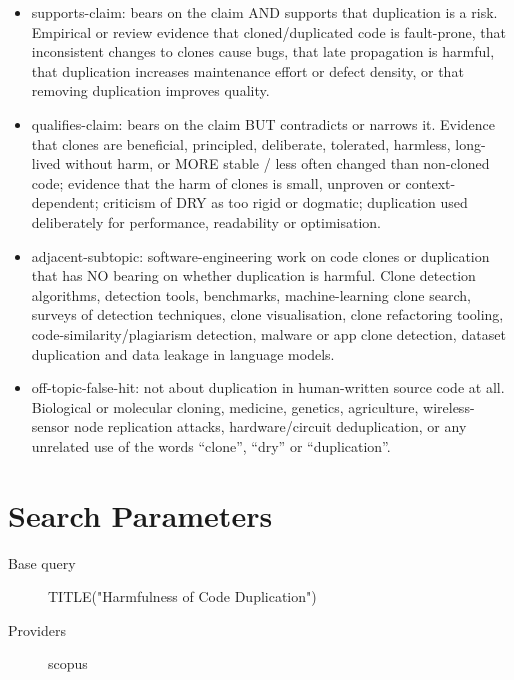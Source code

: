 \documentclass{article}
\begin{document}
\begin{itemize}
\item
  supports-claim: bears on the claim AND supports that duplication is a
  risk. Empirical or review evidence that cloned/duplicated code is
  fault-prone, that inconsistent changes to clones cause bugs, that late
  propagation is harmful, that duplication increases maintenance effort
  or defect density, or that removing duplication improves quality.
\item
  qualifies-claim: bears on the claim BUT contradicts or narrows it.
  Evidence that clones are beneficial, principled, deliberate,
  tolerated, harmless, long-lived without harm, or MORE stable / less
  often changed than non-cloned code; evidence that the harm of clones
  is small, unproven or context-dependent; criticism of DRY as too rigid
  or dogmatic; duplication used deliberately for performance,
  readability or optimisation.
\item
  adjacent-subtopic: software-engineering work on code clones or
  duplication that has NO bearing on whether duplication is harmful.
  Clone detection algorithms, detection tools, benchmarks,
  machine-learning clone search, surveys of detection techniques, clone
  visualisation, clone refactoring tooling, code-similarity/plagiarism
  detection, malware or app clone detection, dataset duplication and
  data leakage in language models.
\item
  off-topic-false-hit: not about duplication in human-written source
  code at all. Biological or molecular cloning, medicine, genetics,
  agriculture, wireless-sensor node replication attacks,
  hardware/circuit deduplication, or any unrelated use of the words
  ``clone'', ``dry'' or ``duplication''.
\end{itemize}

\section{Search Parameters}

\begin{description}
\item[Base query] TITLE("Harmfulness of Code Duplication")
\item[Providers] scopus
\end{description}
\end{document}
